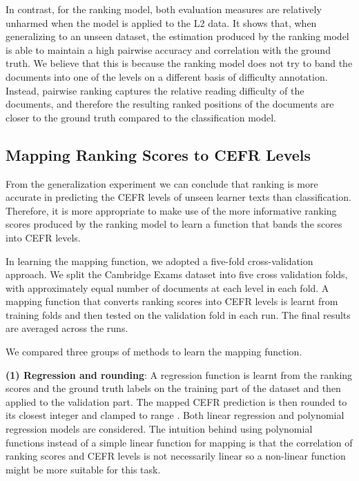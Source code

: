 \documentclass[11pt,letterpaper]{article}
\begin{document}
    
    In contrast, for the ranking model, both evaluation measures are relatively unharmed when the model is applied to the L2 data. It shows that, when generalizing to an unseen dataset, the estimation produced by the ranking model is able to maintain a high pairwise accuracy and correlation with the ground truth. We believe that this is because the ranking model does not try to band the documents into one of the levels on a different basis of difficulty annotation. Instead, pairwise ranking captures the relative reading difficulty of the documents, and therefore the resulting ranked positions of the documents are closer to the ground truth compared to the classification model. 
		

\subsection{Mapping Ranking Scores to CEFR Levels}
\label{sec:mapping}

		From the generalization experiment we can conclude that ranking is more accurate in predicting the CEFR levels of unseen learner texts than classification. Therefore, it is more appropriate to make use of the more informative ranking scores produced by the ranking model to learn a function that bands the scores into CEFR levels.
		
		In learning the mapping function, we adopted a five-fold cross-validation approach. We split the Cambridge Exams dataset into five cross validation folds, with approximately equal number of documents at each level in each fold. A mapping function that converts ranking scores into CEFR levels is learnt from training folds and then tested on the validation fold in each run. The final results are averaged across the runs.
		
		We compared three groups of methods to learn the mapping function. 
		
		{\bf (1) Regression and rounding}: A regression function is learnt from the ranking scores and the ground truth labels on the training part of the dataset and then applied to the validation part. The mapped CEFR prediction is then rounded to its closest integer and clamped to range . Both linear regression and polynomial regression models are considered. The intuition behind using polynomial functions instead of a simple linear function for mapping is that the correlation of ranking scores and CEFR levels is not necessarily linear so a non-linear function might be more suitable for this task.
		
\end{document}
